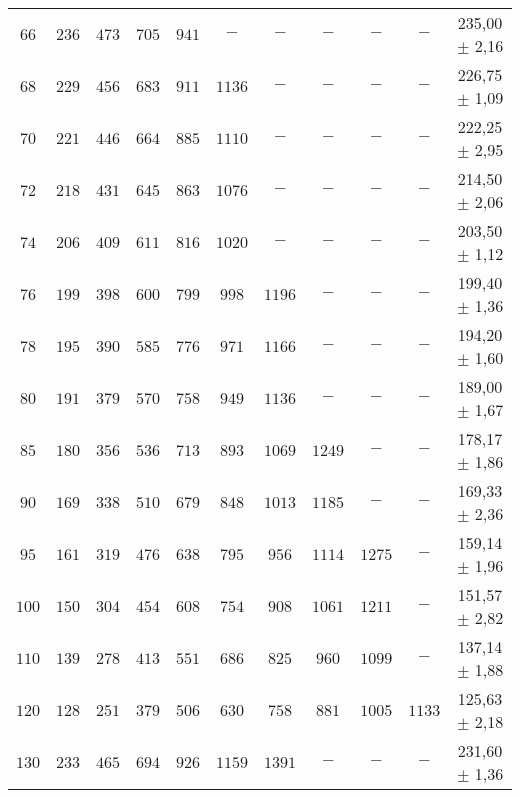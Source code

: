 \begin{table}[H]
\begin{tabular}{c c c c c c c c c c | S[table-format=3.2]}
        $66$ &  $236$ & $473$ &$ 705$  & $941 $ & $-    $ & $-   $ & $-   $ & $-   $ &  $-   $ &   {235,00 $\pm$ 2,16}  \\
        $68$ &  $229$ & $456$ &$ 683$  & $911 $ & $1136 $ & $-   $ & $-   $ & $-   $ &  $-   $ &   {226,75 $\pm$ 1,09}  \\
        $70$ &  $221$ & $446$ &$ 664$  & $885 $ & $1110 $ & $-   $ & $-   $ & $-   $ &  $-   $ &   {222,25 $\pm$ 2,95}  \\
        $72$ &  $218$ & $431$ &$ 645$  & $863 $ & $1076 $ & $-   $ & $-   $ & $-   $ &  $-   $ &   {214,50 $\pm$ 2,06}  \\
        $74$ &  $206$ & $409$ &$ 611$  & $816 $ & $1020 $ & $-   $ & $-   $ & $-   $ &  $-   $ &   {203,50 $\pm$ 1,12}  \\
        $76$ &  $199$ & $398$ &$ 600$  & $799 $ & $998  $ & $1196$ & $-   $ & $-   $ &  $-   $ &   {199,40 $\pm$ 1,36}  \\ 
        $78$ &  $195$ & $390$ &$ 585$  & $776 $ & $971  $ & $1166$ & $-   $ & $-   $ &  $-   $ &   {194,20 $\pm$ 1,60}  \\ 
        $80$ &  $191$ & $379$ &$ 570$  & $758 $ & $949  $ & $1136$ & $-   $ & $-   $ &  $-   $ &   {189,00 $\pm$ 1,67}  \\ 
        $85$ &  $180$ & $356$ &$ 536$  & $713 $ & $893  $ & $1069$ & $1249$ & $-   $ &  $-   $ &   {178,17 $\pm$ 1,86}  \\ 
        $90$ &  $169$ & $338$ &$ 510$  & $679 $ & $848  $ & $1013$ & $1185$ & $-   $ &  $-   $ &   {169,33 $\pm$ 2,36}  \\ 
        $95$ &  $161$ & $319$ &$ 476$  & $638 $ & $795  $ & $956 $ & $1114$ & $1275$ &  $-   $ &   {159,14 $\pm$ 1,96}  \\ 
        $100$ & $150$ & $304$ &$ 454$  & $608 $ & $754  $ & $908 $ & $1061$ & $1211$ &  $-   $ &   {151,57 $\pm$ 2,82}  \\ 
        $110$ & $139$ & $278$ &$ 413$  & $551 $ & $686  $ & $825 $ & $960 $ & $1099$ &  $-   $ &   {137,14 $\pm$ 1,88}  \\ 
        $120$ & $128$ & $251$ &$ 379$  & $506 $ & $630  $ & $758 $ & $881 $ & $1005$ &  $1133$ &   {125,63 $\pm$ 2,18}  \\
        $130$ & $233$ & $465$ &$ 694$  & $926 $ & $1159 $ & $1391$ & $-   $ & $-   $ &  $-   $ &   {231,60 $\pm$ 1,36}  \\ 
    \bottomrule
    \end{tabular}
    \end{table}